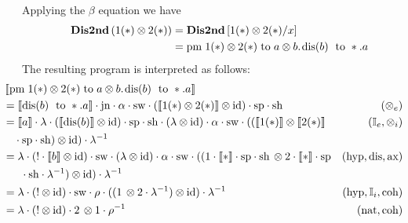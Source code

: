 \begin{example}
   Applying the $\beta$ equation we have 
   \begin{equation*}
    \begin{split}
    \textbf{Dis2nd} \,(1 (*) \otimes 2(*)) & = \textbf{Dis2nd} \,[1 (*) \otimes 2(*)/x] \\
    & = \text{pm} \hspace{3 pt}  1 (*) \otimes 2(*) \hspace{3 pt} \text{to} \hspace{3 pt} a \otimes b. \hspace{1 pt} \text{dis}(b) \hspace{3 pt} \text{ to } *.a
\end{split}
   \end{equation*}
    The resulting program is interpreted as follows:
    \begin{align*}
   & \hspace{-30pt} \sem{ \text{pm} \hspace{3 pt}  1 (*) \otimes 2(*) \hspace{3 pt} \text{to} \hspace{3 pt} a \otimes b. \hspace{1 pt} \text{dis}(b) \hspace{3 pt} \text{ to } *.a} \\
   & \hspace{-30pt} = \sem{\text{dis}(b) \hspace{3 pt} \text{ to } *.a} \cdot \jn \cdot \alpha \cdot \sw \cdot \left( \sem{1 (*) \otimes 2(*)} \otimes \id\right) \cdot \spt \cdot \sh   & (\otimes_e) \\
   & \hspace{-30pt} = \sem{a} \cdot \lambda \cdot (\sem{\text{dis}(b)} \otimes \id) \cdot \spt \cdot \sh \cdot (\lambda \otimes \id) \cdot \alpha \cdot \sw \cdot (  (\sem{1(*)} \otimes \sem{2(*)}     & (\typeI_e, \otimes_i) \\
   & \hspace{-20pt} \cdot \spt \cdot \sh)\otimes \id) \cdot  \lambda^{-1}  \\
   & \hspace{-30pt} = \lambda \cdot (! \cdot \sem{b} \otimes \id) \cdot \sw \cdot   (\lambda \otimes \id)  \cdot \alpha \cdot \sw \cdot (( 1 \cdot \sem{*} \cdot \spt \cdot \sh \, \otimes 2 \cdot \sem{*} \cdot \spt  & (\text{hyp},\text{dis},  \text{ax})\\
   &  \hspace{-14pt}    \cdot \sh \cdot \lambda^{-1})\otimes \id) \cdot \lambda^{-1} \\
    & \hspace{-30pt} = \lambda \cdot (! \otimes \id) \cdot \sw \cdot \rho \cdot (( 1  \, \otimes 2 \cdot \lambda^{-1}  ) \otimes \id) \cdot \lambda^{-1}  & (\text{hyp},\typeI_i,\text{coh})\\
   & \hspace{-30pt} =\lambda \cdot (! \otimes \id) \cdot  2  \, \otimes 1 \cdot \rho^{-1}   & (\text{nat}, \text{coh}) 
   \end{align*}


\end{example}
